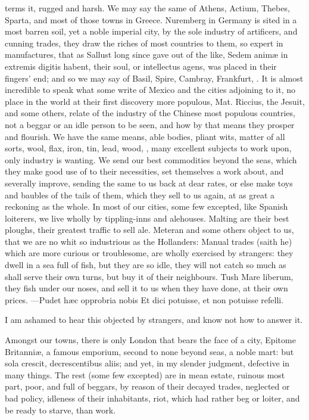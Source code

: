 {terms it, rugged and harsh. We may say the same of Athens, Actium,
Thebes, Sparta, and most of those towns in Greece. Nuremberg in Germany
is sited in a most barren soil, yet a noble imperial city, by the sole
industry of artificers, and cunning trades, they draw the riches of
most countries to them, so expert in manufactures, that as Sallust long
since gave out of the like, Sedem anim\ae{} in extremis digitis habent,
their soul, or intellectus agens, was placed in their fingers' end; and
so we may say of Basil, Spire, Cambray, Frankfurt, \etc{}. It is almost
incredible to speak what some write of Mexico and the cities adjoining
to it, no place in the world at their first discovery more populous,
Mat. Riccius, the Jesuit, and some others, relate of the industry
of the Chinese most populous countries, not a beggar or an idle person
to be seen, and how by that means they prosper and flourish. We have
the same means, able bodies, pliant wits, matter of all sorts, wool,
flax, iron, tin, lead, wood, \etc{}, many excellent subjects to work upon,
only industry is wanting. We send our best commodities beyond the seas,
which they make good use of to their necessities, set themselves a work
about, and severally improve, sending the same to us back at dear
rates, or else make toys and baubles of the tails of them, which they
sell to us again, at as great a reckoning as the whole. In most of our
cities, some few excepted, like Spanish loiterers, we live wholly
by tippling-inns and alehouses. Malting are their best ploughs, their
greatest traffic to sell ale. Meteran and some others object to
us, that we are no whit so industrious as the Hollanders: Manual trades
(saith he) which are more curious or troublesome, are wholly exercised
by strangers: they dwell in a sea full of fish, but they are so idle,
they will not catch so much as shall serve their own turns, but buy it
of their neighbours. Tush Mare liberum, they fish under our noses,
and sell it to us when they have done, at their own prices.
---Pudet h\ae{}c opprobria nobis
Et dici potuisse, et non potuisse refelli.

I am ashamed to hear this objected by strangers, and know not how to
answer it.

Amongst our towns, there is only London that bears the face of a
city, Epitome Britanni\ae{}, a famous emporium, second to none beyond
seas, a noble mart: but sola crescit, decrescentibus aliis; and yet, in
my slender judgment, defective in many things. The rest (some few
excepted) are in mean estate, ruinous most part, poor, and full of
beggars, by reason of their decayed trades, neglected or bad policy,
idleness of their inhabitants, riot, which had rather beg or loiter,
and be ready to starve, than work.

}
